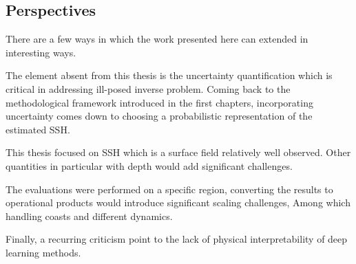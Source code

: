 \begin{bibunit}
\section{Perspectives}
There are a few ways in which the work presented here can extended in interesting ways.

The element absent from this thesis is the uncertainty quantification which is critical in addressing ill-posed inverse problem. Coming back to the methodological framework introduced in the first chapters, incorporating uncertainty comes down to choosing a probabilistic representation of the estimated SSH.


This thesis focused on SSH which is a surface field relatively well observed. Other quantities in particular with depth would add significant challenges.

The evaluations were performed on a specific region, converting the results to operational products would introduce significant scaling challenges, Among which handling coasts and different dynamics.


Finally, a recurring criticism point to the lack of physical interpretability of deep learning methods. 





\end{bibunit}
